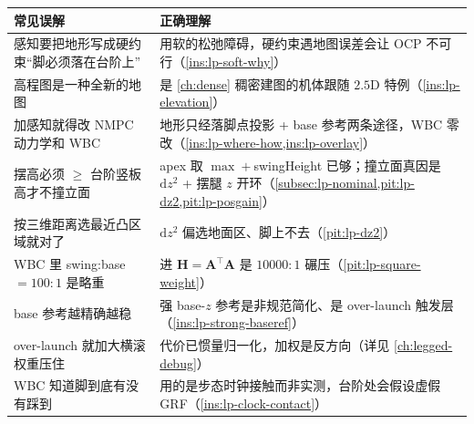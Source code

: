 \begin{table}[H]\centering\small
\begin{tabular}{p{} p{}}
\toprule
\textbf{常见误解} & \textbf{正确理解} \\
\midrule
感知要把地形写成硬约束“脚必须落在台阶上” & 用软的松弛障碍，硬约束遇地图误差会让 OCP 不可行（\cref{ins:lp-soft-why}）\\
高程图是一种全新的地图 & 是 \cref{ch:dense} 稠密建图的机体跟随 $2.5$D 特例（\cref{ins:lp-elevation}）\\
加感知就得改 NMPC 动力学和 WBC & 地形只经落脚点投影 + base 参考两条途径，WBC 零改（\cref{ins:lp-where-how,ins:lp-overlay}）\\
摆高必须 $\ge$ 台阶竖板高才不撞立面 & apex 取 $\max+$swingHeight 已够；撞立面真因是 $\mathrm{d}z^2$ + 摆腿 $z$ 开环（\cref{subsec:lp-nominal,pit:lp-dz2,pit:lp-posgain}）\\
按三维距离选最近凸区域就对了 & $\mathrm{d}z^2$ 偏选地面区、脚上不去（\cref{pit:lp-dz2}）\\
WBC 里 swing:base$=100{:}1$ 是略重 & 进 $\mathbf{H}=\mathbf{A}^\top\mathbf{A}$ 是 $10000{:}1$ 碾压（\cref{pit:lp-square-weight}）\\
base 参考越精确越稳 & 强 base-$z$ 参考是非规范简化、是 over-launch 触发层（\cref{ins:lp-strong-baseref}）\\
over-launch 就加大横滚权重压住 & 代价已惯量归一化，加权是反方向（详见 \cref{ch:legged-debug}）\\
WBC 知道脚到底有没有踩到 & 用的是步态时钟接触而非实测，台阶处会假设虚假 GRF（\cref{ins:lp-clock-contact}）\\
\bottomrule
\end{tabular}
\end{table}

